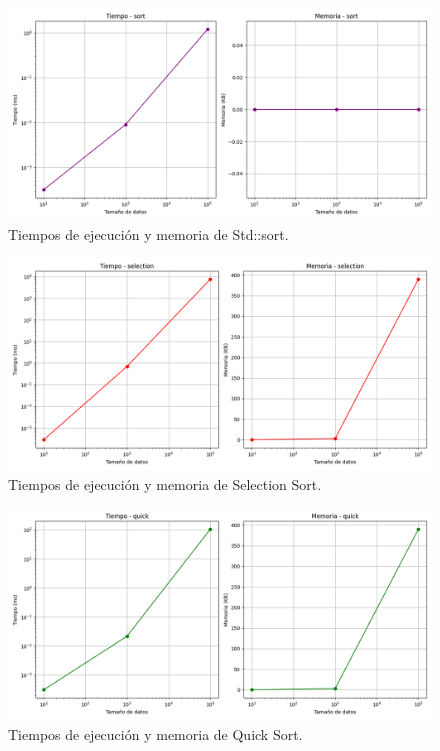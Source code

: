 \begin{figure}[H]
    \centering
    \includegraphics[width=\textwidth]{../code/sorting/data/plots/scaling_sort.png}
    \caption{Tiempos de ejecución y memoria de Std::sort.}
    \label{fig:scaling_sort}
\end{figure}

\begin{figure}[H]
    \centering
    \includegraphics[width=\textwidth]{../code/sorting/data/plots/scaling_selection.png}
    \caption{Tiempos de ejecución y memoria de Selection Sort.}
    \label{fig:scaling_selection}
\end{figure}

\begin{figure}[H]
    \centering
    \includegraphics[width=\textwidth]{../code/sorting/data/plots/scaling_quick.png}
    \caption{Tiempos de ejecución y memoria de Quick Sort.}
    \label{fig:scaling_quick}
\end{figure}

